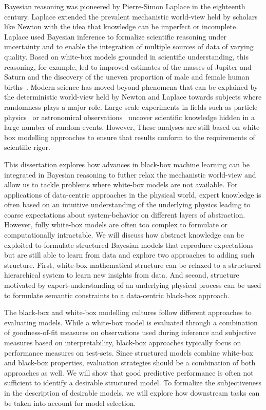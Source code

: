 Bayesian reasoning was pioneered by Pierre-Simon Laplace in the eighteenth century.
Laplace extended the prevalent mechanistic world-view held by scholars like Newton with the idea that knowledge can be imperfect or incomplete.
Laplace used Bayesian inference to formalize scientific reasoning under uncertainty and to enable the integration of multiple sources of data of varying quality.
Based on white-box models grounded in scientific understanding, this reasoning, for example, led to improved estimates of the masses of Jupiter and Saturn and the discovery of the uneven proportion of male and female human births~\parencite{pulskamp_laplace_2020,laplace_theorie_1820}.
Modern science has moved beyond phenomena that can be explained by the deterministic world-view held by Newton and Laplace towards subjects where randomness plays a major role.
Large-scale experiments in fields such as particle physics~\parencite{khachatryan_observation_2015} or astronomical observations~\parencite{collaboration_first_2019,the_ligo_scientific_collaboration_observation_2016} uncover scientific knowledge hidden in a large number of random events.
However, These analyses are still based on white-box modelling approaches to ensure that results conform to the requirements of scientific rigor.

This dissertation explores how advances in black-box machine learning can be integrated in Bayesian reasoning to futher relax the mechanistic world-view and allow us to tackle problems where white-box models are not available.
For applications of data-centric approaches in the physical world, expert knowledge is often based on an intuitive understanding of the underlying physics leading to coarse expectations about system-behavior on different layers of abstraction.
However, fully white-box models are often too complex to formulate or computationally intractable.
We will discuss how abstract knowledge can be exploited to formulate structured Bayesian models that reproduce expectations but are still able to learn from data and explore two approaches to adding such structure.
First, white-box mathematical structure can be relaxed to a structured hierarchical system to learn new insights from data.
And second, structure motivated by expert-understanding of an underlying physical process can be used to formulate semantic constraints to a data-centric black-box approach.

The black-box and white-box modelling cultures follow different approaches to evaluating models.
While a white-box model is evaluated through a combination of goodness-of-fit measures on observations used during inference and subjective measures based on interpretability, black-box approaches typically focus on performance measures on test-sets.
Since structured models combine white-box and black-box properties, evaluation strategies should be a combination of both approaches as well.
We will show that good predictive performance is often not sufficient to identify a desirable structured model.
To formalize the subjectiveness in the description of desirable models, we will explore how downstream tasks can be taken into account for model selection.


